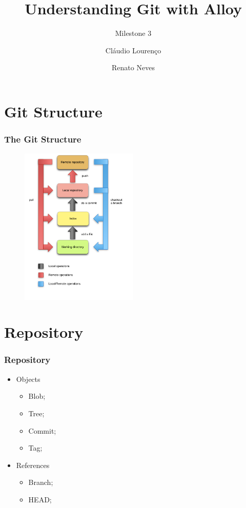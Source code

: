 \documentclass{beamer}
\title{Understanding Git with Alloy}
\subtitle{Milestone 3}
\author{Cláudio Lourenço \and Renato Neves}
\institute{University of Minho\\
Formal Methods in Software Engineering}
\begin{document}
\frame {
   \titlepage
}


\section{Git Structure}
\begin{frame}
   \frametitle{The Git Structure}
   \begin{figure}
      \centering
      \includegraphics[width=0.5\textwidth]{images/git_workflow.png}
   \end{figure}
\end{frame}

\section{Repository}
\begin{frame}
   \frametitle{Repository}
   \begin{centering}
      \begin{itemize}
         \item Objects
            \begin{itemize}
               \item Blob;
               \item Tree;
               \item Commit;
               \item Tag;
            \end{itemize}
         \item References
            \begin{itemize}
               \item Branch;
               \item HEAD;
            \end{itemize}
      \end{itemize}
   \end{centering}
\end{frame}
\end{document}

